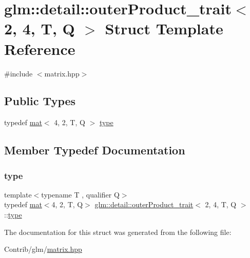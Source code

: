 \hypertarget{structglm_1_1detail_1_1outer_product__trait_3_012_00_014_00_01_t_00_01_q_01_4}{}\section{glm\+:\+:detail\+:\+:outer\+Product\+\_\+trait$<$ 2, 4, T, Q $>$ Struct Template Reference}
\label{structglm_1_1detail_1_1outer_product__trait_3_012_00_014_00_01_t_00_01_q_01_4}


{\ttfamily \#include $<$matrix.\+hpp$>$}

\subsection*{Public Types}
\begin{DoxyCompactItemize}
\item 
typedef \mbox{\hyperlink{structglm_1_1mat}{mat}}$<$ 4, 2, T, Q $>$ \mbox{\hyperlink{structglm_1_1detail_1_1outer_product__trait_3_012_00_014_00_01_t_00_01_q_01_4_a25bc2e0604357ef39ab2a35015b1f9c8}{type}}
\end{DoxyCompactItemize}


\subsection{Member Typedef Documentation}
\mbox{\label{structglm_1_1detail_1_1outer_product__trait_3_012_00_014_00_01_t_00_01_q_01_4_a25bc2e0604357ef39ab2a35015b1f9c8}} 
\subsubsection{\texorpdfstring{type}{type}}
{\footnotesize\ttfamily template$<$typename T , qualifier Q$>$ \\
typedef \mbox{\hyperlink{structglm_1_1mat}{mat}}$<$4, 2, T, Q$>$ \mbox{\hyperlink{structglm_1_1detail_1_1outer_product__trait}{glm\+::detail\+::outer\+Product\+\_\+trait}}$<$ 2, 4, T, Q $>$\+::\mbox{\hyperlink{structglm_1_1detail_1_1outer_product__trait_3_012_00_014_00_01_t_00_01_q_01_4_a25bc2e0604357ef39ab2a35015b1f9c8}{type}}}



The documentation for this struct was generated from the following file\+:\begin{DoxyCompactItemize}
\item 
Contrib/glm/\mbox{\hyperlink{matrix_8hpp}{matrix.\+hpp}}\end{DoxyCompactItemize}
